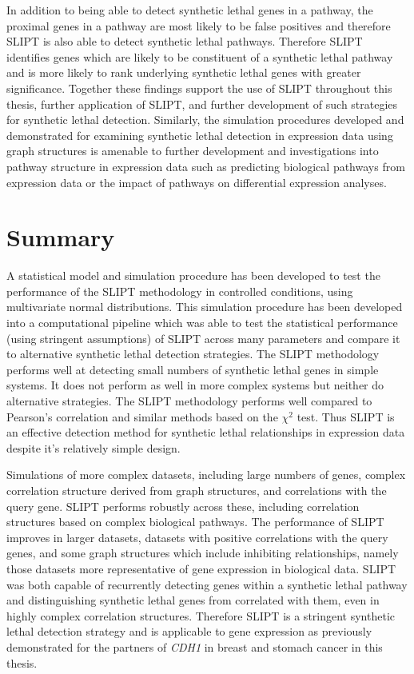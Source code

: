 In addition to being able to detect synthetic lethal genes in a pathway, the proximal genes in a pathway are most likely to be false positives and therefore \gls{SLIPT} is also able to detect synthetic lethal pathways. Therefore \gls{SLIPT} identifies genes which are likely to be constituent of a synthetic lethal pathway and is more likely to rank underlying synthetic lethal genes with greater significance. Together these findings support the use of \gls{SLIPT} throughout this thesis, further application of \gls{SLIPT}, and further development of such strategies for synthetic lethal detection. Similarly, the simulation procedures developed and demonstrated for examining synthetic lethal detection in expression data using graph structures is amenable to further development and investigations into pathway structure in expression data such as predicting biological pathways from expression data or the impact of pathways on differential expression analyses.


\section{Summary}

A statistical model and simulation procedure has been developed to test the performance of the \gls{SLIPT} methodology in controlled conditions, using multivariate normal distributions. This simulation procedure has been developed into a computational pipeline which was able to test the statistical performance (using stringent assumptions) of \gls{SLIPT} across many parameters and compare it to alternative synthetic lethal detection strategies. The \gls{SLIPT} methodology performs well at detecting small numbers of synthetic lethal genes in simple systems. It does not perform as well in more complex systems but neither do alternative strategies. The \gls{SLIPT} methodology performs well compared to Pearson's correlation and similar methods based on the $\chi^2$ test. Thus \gls{SLIPT} is an effective detection method for synthetic lethal relationships in expression data despite it's relatively simple design.

Simulations of more complex datasets, including large numbers of genes, complex correlation structure derived from graph structures, and correlations with the query gene. \gls{SLIPT} performs robustly across these, including correlation structures based on complex biological pathways. The performance of \gls{SLIPT} improves in larger datasets, datasets with positive correlations with the query genes, and some graph structures which include inhibiting relationships, namely those datasets more representative of gene expression in biological data. \gls{SLIPT} was both capable of recurrently detecting genes within a synthetic lethal pathway and distinguishing synthetic lethal genes from correlated with them, even in highly complex correlation structures. Therefore \gls{SLIPT} is a stringent synthetic lethal detection strategy and is applicable to gene expression as previously demonstrated for the partners of \textit{CDH1} in breast and stomach cancer in this thesis.

